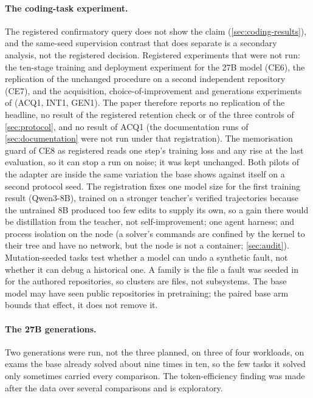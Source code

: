 \paragraph{The coding-task experiment.} The registered confirmatory query does not show the claim
(\cref{sec:coding-results}), and the same-seed supervision contrast that does separate is a secondary
analysis, not the registered decision. Registered experiments that were not run: the ten-stage
training and deployment experiment for the 27B model (CE6), the replication of the unchanged procedure
on a second independent repository (CE7), and the acquisition, choice-of-improvement and generations
experiments of  (ACQ1, INT1, GEN1). The paper therefore reports no
replication of the headline, no result of the registered retention check or of the three controls of
\cref{sec:protocol}, and no result of ACQ1 (the documentation runs of \cref{sec:documentation} were not
run under that registration). The memorisation guard of CE8 as registered reads one step's training
loss and any rise at the last evaluation, so it can stop a run on noise; it was kept unchanged.
Both pilots of the adapter are inside the same variation the base shows against itself on a second
protocol seed. The registration fixes one model size for the first training result (Qwen3-8B),
trained on a stronger teacher's verified trajectories because the untrained 8B produced too few edits
to supply its own, so a gain there would be distillation from the teacher, not
self-improvement; one agent harness; and process isolation  on the node (a
solver's commands are confined by the kernel to their tree and have no network, but the node is not a
container; \cref{sec:audit}). Mutation-seeded tasks test whether a model can undo a
synthetic fault, not whether it can debug a historical one. A family is the file a fault was seeded in
for the authored repositories, so clusters are files, not subsystems. The base model may have
seen public repositories in pretraining; the paired base arm bounds that effect, it does not remove it.

\paragraph{The 27B generations.} Two generations were run, not the three planned, on three of four
workloads, on exams the base already solved about nine times in ten, so the few tasks it solved only
sometimes carried every comparison. The token-efficiency finding was made after the data
over several comparisons and is exploratory.

